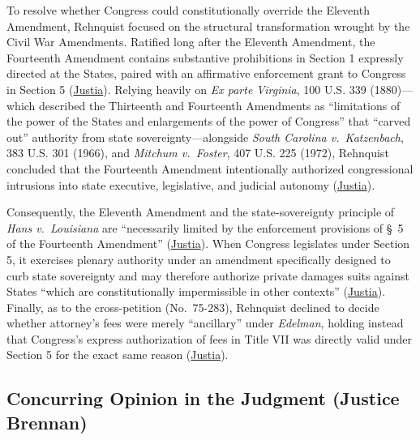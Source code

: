 \documentclass[12pt]{article}
\begin{document}
To resolve whether Congress could constitutionally override the Eleventh Amendment, Rehnquist focused on the structural transformation wrought by the Civil War Amendments. Ratified long after the Eleventh Amendment, the Fourteenth Amendment contains substantive prohibitions in Section 1 expressly directed at the States, paired with an affirmative enforcement grant to Congress in Section 5 (\href{https://supreme.justia.com/cases/federal/us/427/445/}{Justia}). Relying heavily on \textit{Ex parte Virginia}, 100 U.S. 339 (1880)---which described the Thirteenth and Fourteenth Amendments as ``limitations of the power of the States and enlargements of the power of Congress'' that ``carved out'' authority from state sovereignty---alongside \textit{South Carolina v.\ Katzenbach}, 383 U.S. 301 (1966), and \textit{Mitchum v.\ Foster}, 407 U.S. 225 (1972), Rehnquist concluded that the Fourteenth Amendment intentionally authorized congressional intrusions into state executive, legislative, and judicial autonomy (\href{https://supreme.justia.com/cases/federal/us/427/445/}{Justia}).

Consequently, the Eleventh Amendment and the state-sovereignty principle of \textit{Hans v.\ Louisiana} are ``necessarily limited by the enforcement provisions of \S~5 of the Fourteenth Amendment'' (\href{https://supreme.justia.com/cases/federal/us/427/445/}{Justia}). When Congress legislates under Section 5, it exercises plenary authority under an amendment specifically designed to curb state sovereignty and may therefore authorize private damages suits against States ``which are constitutionally impermissible in other contexts'' (\href{https://supreme.justia.com/cases/federal/us/427/445/}{Justia}). Finally, as to the cross-petition (No.\ 75-283), Rehnquist declined to decide whether attorney's fees were merely ``ancillary'' under \textit{Edelman}, holding instead that Congress's express authorization of fees in Title VII was directly valid under Section 5 for the exact same reason (\href{https://supreme.justia.com/cases/federal/us/427/445/}{Justia}).

\subsection{Concurring Opinion in the Judgment (Justice Brennan)}
\end{document}
